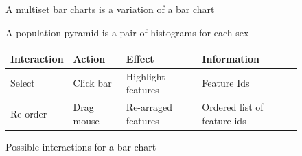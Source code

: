 \documentclass{article}
\begin{document}
\begin{figure}
  \begin{center}
    \qquad
  \end{center}
  \caption{A multiset bar charts is a variation of a bar chart}
  \label{fig:concept:chart-types:bar-charts}
\end{figure}

\begin{figure}
  \centering
    \qquad
    \caption{A population pyramid is a pair of histograms for each sex}%
    \label{fig:concept:chart-types:histograms}
\end{figure}


\begin{figure}
  \begin{center}
    \begin{tabular}{l l l l}
      Interaction & Action & Effect & Information \\
      \hline
      Select & Click bar & Highlight features & Feature Ids \\
      Re-order & Drag mouse & Re-arraged features & Ordered list of feature ids \\
    \end{tabular}
  \end{center}
  \caption{Possible interactions for a bar chart}
  \label{tab:concept:chart-types:bar-chart}
\end{figure}
\end{document}
